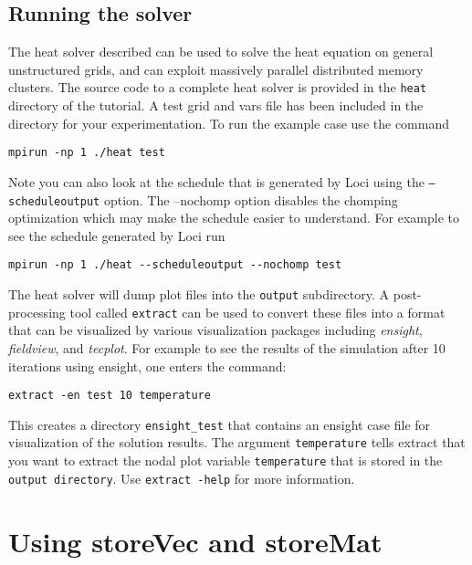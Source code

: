 \documentclass[10pt,epsf,letterpaper,twoside]{book}
\begin{document}
\section{Running the solver}

The heat solver described can be used to solve the heat equation on
general unstructured grids, and can exploit massively parallel
distributed memory clusters.  The source code to a complete heat
solver is provided in the {\tt heat} directory of the tutorial.  A
test grid and vars file has been included in the directory for your
experimentation.  To run the example case use the command
\begin{verbatim}
mpirun -np 1 ./heat test
\end{verbatim}

Note you can also look at the schedule that is generated by Loci using
the {\tt --scheduleoutput} option.  The {--nochomp} option disables
the chomping optimization which may make the schedule easier to
understand.  For example to see the schedule generated by Loci run
\begin{verbatim}
mpirun -np 1 ./heat --scheduleoutput --nochomp test
\end{verbatim}

The heat solver will dump plot files into the {\tt output}
subdirectory. A post-processing tool called {\tt extract} can be used
to convert these files into a format that can be visualized by various
visualization packages including {\it ensight}, {\it fieldview}, and
{\it tecplot}.  For example to see the results of the simulation after
10 iterations using ensight, one enters the command:
\begin{verbatim}
extract -en test 10 temperature
\end{verbatim}
This creates a directory {\tt ensight\_test} that contains an ensight case
file for visualization of the solution results.  The argument
{\tt temperature} tells extract that you want to extract the nodal plot
variable {\tt temperature} that is stored in the {\tt output
  directory}.  Use {\tt extract -help} for more information.

\chapter{Using storeVec and storeMat}
\end{document}
